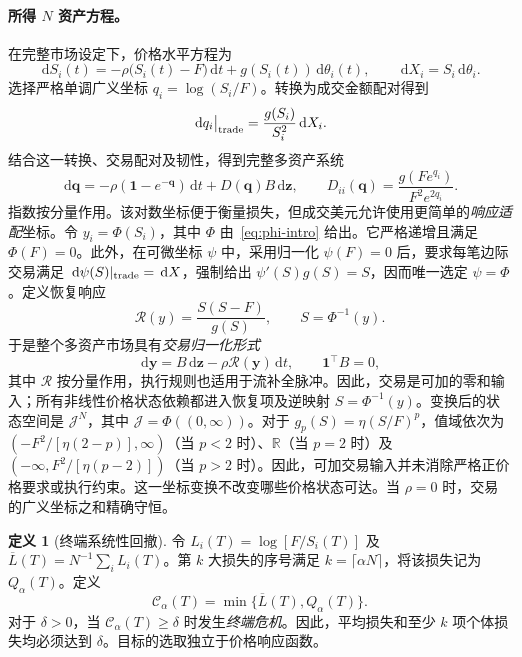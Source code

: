 \documentclass[11pt]{article}
\numberwithin{equation}{section}
\theoremstyle{definition}
\newtheorem{definition}[theorem]{定义}
\theoremstyle{remark}
\newcommand{\Cris}{\mathcal{C}}
\newcommand{\dd}{\,\mathrm{d}}
\newcommand{\one}{\mathbf{1}}
\begin{document}
\paragraph{所得 $N$ 资产方程。} 在完整市场设定下，价格水平方程为
\begin{equation}\label{eq:level-dynamics}
\boxed{\dd S_i(t)=-\rho\big(S_i(t)-F\big)\dd t+g(S_i(t))\dd\theta_i(t),\qquad \dd X_i=S_i\dd\theta_i.}
\end{equation}
选择严格单调广义坐标 $q_i=\log(S_i/F)$。转换为成交金额配对得到
\begin{equation}\label{eq:log-impact}
\dd q_i\big|_{\rm trade}=\frac{g(S_i)}{S_i^2}\dd X_i.
\end{equation}
结合这一转换、交易配对及韧性，得到完整多资产系统
\begin{equation}\label{eq:master}
\boxed{\dd\bm q=-\rho(\one-e^{-\bm q})\dd t+D(\bm q)B\dd\bm z,\qquad
D_{ii}(\bm q)=\frac{g(Fe^{q_i})}{F^2e^{2q_i}}.}
\end{equation}
指数按分量作用。该对数坐标便于衡量损失，但成交美元允许使用更简单的\emph{响应适配}坐标。令 $y_i=\Phi(S_i)$，其中 $\Phi$ 由~\eqref{eq:phi-intro} 给出。它严格递增且满足 $\Phi(F)=0$。此外，在可微坐标 $\psi$ 中，采用归一化 $\psi(F)=0$ 后，要求每笔边际交易满足 $\dd\psi(S)|_{\rm trade}=\dd X$，强制给出 $\psi'(S)g(S)=S$，因而唯一选定 $\psi=\Phi$。定义恢复响应
\[
\mathcal R(y)=\frac{S(S-F)}{g(S)},\qquad S=\Phi^{-1}(y).
\]
于是整个多资产市场具有\emph{交易归一化形式}
\begin{equation}\label{eq:normal-form}
\boxed{\dd\bm y=B\dd\bm z-\rho\mathcal R(\bm y)\dd t,\qquad\one^\top B=0,}
\end{equation}
其中 $\mathcal R$ 按分量作用，执行规则也适用于流补全脉冲。因此，交易是可加的零和输入；所有非线性价格状态依赖都进入恢复项及逆映射 $S=\Phi^{-1}(y)$。变换后的状态空间是 $\mathcal J^N$，其中 $\mathcal J=\Phi((0,\infty))$。对于 $g_p(S)=\eta(S/F)^p$，值域依次为 $(-F^2/[\eta(2-p)],\infty)$（当 $p<2$ 时）、$\mathbb R$（当 $p=2$ 时）及 $(-\infty,F^2/[\eta(p-2)])$（当 $p>2$ 时）。因此，可加交易输入并未消除严格正价格要求或执行约束。这一坐标变换不改变哪些价格状态可达。当 $\rho=0$ 时，交易的广义坐标之和精确守恒。

\begin{definition}[终端系统性回撤]\label{def:crash}
令 $L_i(T)=\log[F/S_i(T)]$ 及 $\overline L(T)=N^{-1}\sum_i L_i(T)$。第 $k$ 大损失的序号满足 $k=\lceil\alpha N\rceil$，将该损失记为 $Q_\alpha(T)$。定义
\begin{equation}\label{eq:crash}
\boxed{\Cris_\alpha(T)=\min\{\overline L(T),Q_\alpha(T)\}.}
\end{equation}
对于 $\delta>0$，当 $\Cris_\alpha(T)\ge\delta$ 时发生\emph{终端危机}。因此，平均损失和至少 $k$ 项个体损失均必须达到 $\delta$。目标的选取独立于价格响应函数。
\end{definition}
\end{document}
